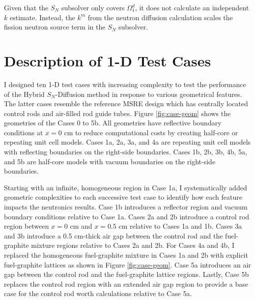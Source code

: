 Given that the $S_N$ subsolver only covers $\Omega^d_1$, it does not calculate an independent $k$
estimate. Instead, the $k^m$ from the neutron diffusion calculation scales the fission neutron
source term in the $S_N$ subsolver.

\section{Description of 1-D Test Cases} \label{sec:test-case}

I designed ten 1-D test cases with increasing complexity to test the performance of the Hybrid
$S_N$-Diffusion method in response to various geometrical features. The latter cases resemble the
reference \gls{MSRE} design \cite{robertson_msre_1965} which has centrally located control rods and
air-filled rod guide tubes. Figure \ref{fig:case-geom} shows the geometries of the Cases 0 to 5b.
All geometries have reflective boundary conditions at $x=0$ cm to reduce computational costs by
creating half-core or repeating unit cell models. Cases 1a, 2a, 3a, and 4a are repeating unit
cell models with reflecting boundaries on the right-side boundaries. Cases 1b, 2b, 3b, 4b, 5a, and
5b are half-core models with vacuum boundaries on the right-side boundaries.

Starting with an infinite, homogeneous region in Case 1a, I systematically added geometric
complexities to each successive test case to identify how each feature impacts the neutronics
results. Case 1b introduces a reflector region and vacuum boundary conditions relative to Case 1a.
Cases 2a and 2b introduce a control rod region between $x=0$ cm and $x=0.5$ cm relative to Cases 1a
and 1b. Cases 3a and 3b introduce a 0.5 cm-thick air gap between the control rod and the
fuel-graphite mixture regions relative to Cases 2a and 2b. For Cases 4a and 4b, I replaced the
homogeneous fuel-graphite mixture in Cases 1a and 2b with explicit fuel-graphite lattices as shown
in Figure \ref{fig:case-geom}. Case 5a introduces an air gap between the control rod and the
fuel-graphite lattice regions. Lastly, Case 5b replaces the control rod region with an extended
air gap region to provide a base case for the control rod worth calculations relative to Case 5a.

